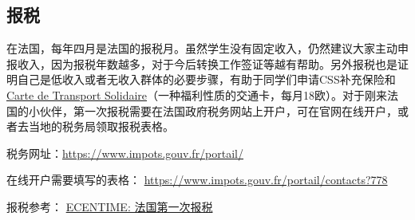 \subsection{报税}

在法国，每年四月是法国的报税月。虽然学生没有固定收入，仍然建议大家主动申报收入，因为报税年数越多，对于今后转换工作签证等越有帮助。另外报税也是证明自己是低收入或者无收入群体的必要步骤，有助于同学们申请CSS补充保险和\href{https://www.solidaritetransport.fr/}{Carte de Transport Solidaire}（一种福利性质的交通卡，每月18欧）。对于刚来法国的小伙伴，第一次报税需要在法国政府税务网站上开户，可在官网在线开户，或者去当地的税务局领取报税表格。

税务网址：\href{https://www.impots.gouv.fr/portail/}{https://www.impots.gouv.fr/portail/} 

在线开户需要填写的表格：
\href{https://www.impots.gouv.fr/portail/contacts?778}{https://www.impots.gouv.fr/portail/contacts?778}

报税参考：
\href{https://www.ecentime.com/article/ecentime-impots-france}{ECENTIME: 法国第一次报税}
